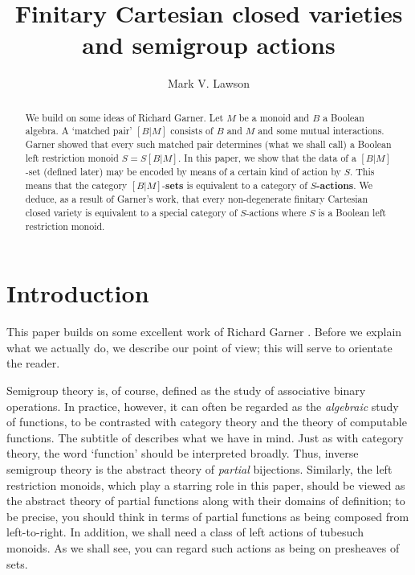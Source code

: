 \documentclass[a4paper]{amsart}
\title{Finitary Cartesian closed varieties and semigroup actions}
\author{Mark V. Lawson}
\begin{document}


\begin{abstract}
We build on some ideas of Richard Garner.
Let $M$ be a monoid and $B$ a Boolean algebra.
A `matched pair' $[B|M]$ consists of $B$ and $M$ and some mutual interactions.
Garner showed that every such matched pair determines (what we shall call)
a Boolean left restriction monoid $S = S[B|M]$.
In this paper, we show that the data of a $[B|M]$-set (defined later)
may be encoded by means of a certain kind of action by $S$.
This means that the category $[B|M]$-{\bf sets} is equivalent to
a category of {\bf $S$-actions}.
We deduce, as a result of Garner's work, that every non-degenerate finitary Cartesian closed variety 
is equivalent to a special category of $S$-actions where $S$ is a Boolean left restriction monoid.

\end{abstract}
\maketitle


\section{Introduction}

This paper builds on some excellent work of Richard Garner  \cite{G2024, G2025}.
Before we explain what we actually do, we describe our point of view; this will serve to orientate the reader.

Semigroup theory is, of course, defined as the study of associative binary operations.
In practice, however, it can often be regarded as the {\em algebraic} study of functions, to be contrasted with
category theory and the theory of computable functions.
The subtitle of \cite{JS} describes what we have in mind.
Just as with category theory, the word `function' should be interpreted broadly.
Thus, inverse semigroup theory is the abstract theory of {\em partial} bijections.
Similarly, the left restriction monoids, which play a starring role in this paper,
should be viewed as the abstract theory of partial functions along with their domains of definition;
to be precise, you should think in terms of partial functions as being composed from left-to-right.
In addition, we shall need a class of left actions of tubesuch monoids.
As we shall see, you can regard such actions as being on presheaves of sets. 
\end{document}
